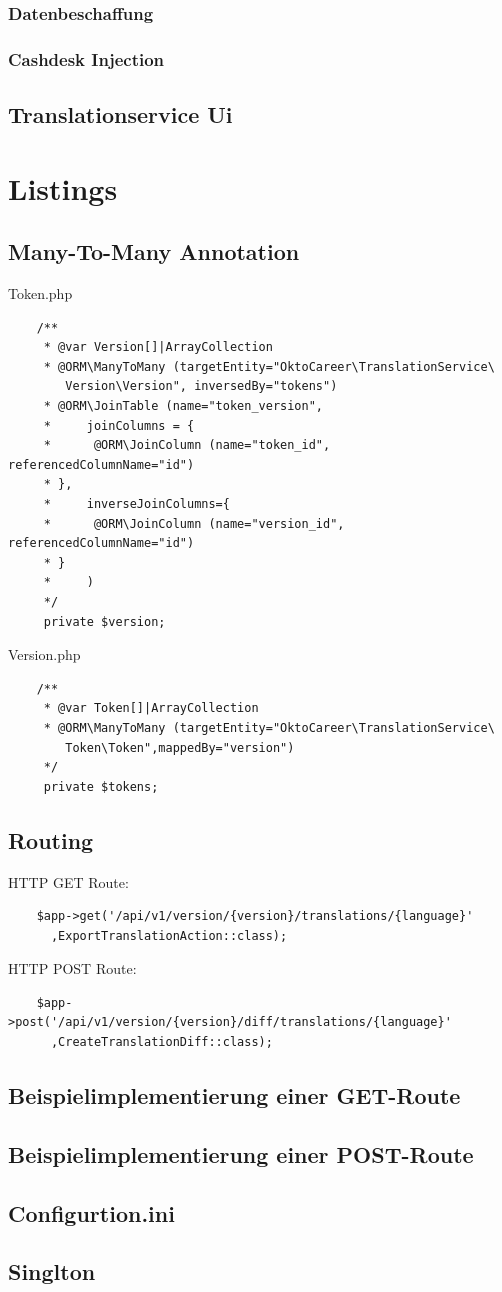 \documentclass[10pt, oneside]{article}
\begin{document}
  \subsubsection{Datenbeschaffung}\label{sec:impl:algo:load}
  \subsubsection{Cashdesk Injection}\label{sec:impl:algo:inj}
  \subsection{Translationservice Ui}\label{sec:impl:ui}
  \section{Listings}
  \subsection{Many-To-Many Annotation}\label{sec:lst:mtmA}
    Token.php
  \begin{lstlisting}
    /**
     * @var Version[]|ArrayCollection
     * @ORM\ManyToMany (targetEntity="OktoCareer\TranslationService\
        Version\Version", inversedBy="tokens")
     * @ORM\JoinTable (name="token_version",
     *     joinColumns = {
     *      @ORM\JoinColumn (name="token_id", referencedColumnName="id")
     * },
     *     inverseJoinColumns={
     *      @ORM\JoinColumn (name="version_id", referencedColumnName="id")
     * }
     *     )
     */
     private $version;
  \end{lstlisting}
  Version.php
  \begin{lstlisting}
    /**
     * @var Token[]|ArrayCollection
     * @ORM\ManyToMany (targetEntity="OktoCareer\TranslationService\
        Token\Token",mappedBy="version")
     */
     private $tokens;
  \end{lstlisting}
  \subsection{Routing}\label{sec:lst:routes}
  HTTP GET Route:
  \begin{lstlisting}
    $app->get('/api/v1/version/{version}/translations/{language}'
      ,ExportTranslationAction::class);
  \end{lstlisting}
  HTTP POST Route:
  \begin{lstlisting}
    $app->post('/api/v1/version/{version}/diff/translations/{language}'
      ,CreateTranslationDiff::class);
  \end{lstlisting}
  \subsection{Beispielimplementierung einer GET-Route}\label{lst:impl:bl:GET}
  \subsection{Beispielimplementierung einer POST-Route}\label{lst:impl:bl:POST}
  \subsection{Configurtion.ini}\label{lst:impl:ul:config}
  \subsection{Singlton}\label{sec:lst:singleton}
\end{document}
